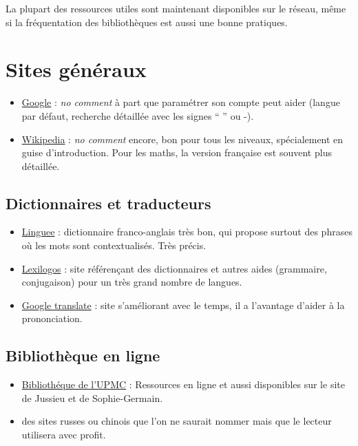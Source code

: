 
La plupart des ressources utiles sont maintenant disponibles sur le réseau,
même si la fréquentation des bibliothèques est aussi une bonne pratiques.


\section{Sites généraux}
\begin{itemize}
 \item \href{www.google.com}{Google} : 
\textit{no comment} à part que paramétrer son compte
peut aider (langue par défaut, recherche détaillée avec les signes `` '' ou -).

\item \href{http://wikipedia.org/}{Wikipedia} : \textit{no comment} encore, 
bon pour tous les niveaux, spécialement en guise d'introduction. Pour les maths,
la version française est souvent plus détaillée.

\end{itemize}




\subsection{Dictionnaires et traducteurs}

\begin{itemize}
\item \href{http://www.linguee.com/}{Linguee} : dictionnaire franco-anglais très bon, qui propose 
surtout des phrases où les mots sont contextualisés. Très précis.
\item \href{http://www.lexilogos.com/}{Lexilogos} : site référençant des dictionnaires et autres
aides (grammaire, conjugaison) pour un très grand nombre de langues. 
\item \href{https://translate.google.fr/}{Google translate} : site s'améliorant avec le temps, 
il a l'avantage d'aider à la prononciation.
\end{itemize}


\subsection{Biblioth\`eque en ligne}

\begin{itemize}

\item \href{http://catalogue-bibliotheques.upmc.fr/#focus}{Biblioth\'eque de l'UPMC} : Ressources en 
ligne et aussi disponibles sur le site de Jussieu et de Sophie-Germain.

\item des sites russes ou chinois que l'on ne saurait nommer mais que le lecteur utilisera avec profit.

\end{itemize}


